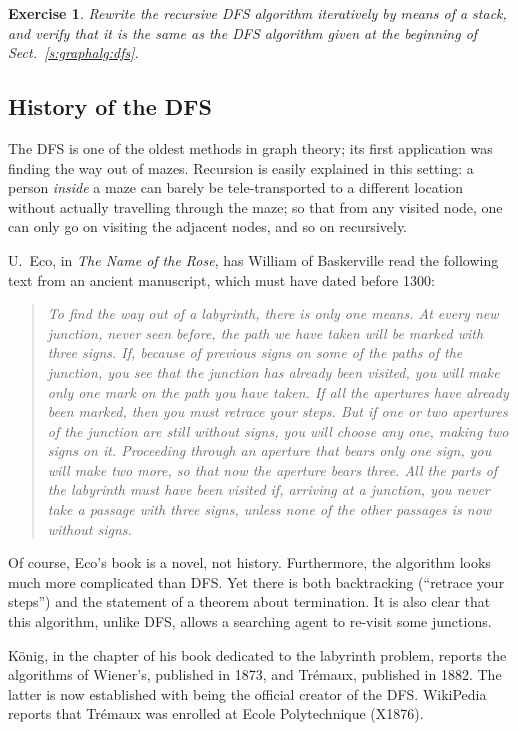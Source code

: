 \documentclass[a4paper]{book}
\theoremstyle{changebreak}                %
\newtheorem{ex}[result]{Exercise}
\begin{document}
\begin{ex}
Rewrite the recursive DFS algorithm iteratively by means of a stack,
and verify that it is the same as the DFS algorithm given at the
beginning of Sect.~\ref{s:graphalg:dfs}.
\end{ex}

\subsection{History of the DFS}
The DFS is one of the oldest methods in graph
theory; its first application was finding the way
out of mazes. Recursion is easily
explained in this setting: a person {\it inside} a maze can barely be
tele-transported to a different location without actually travelling
through the maze; so that from any visited node, one can only go on
visiting the adjacent nodes, and so on recursively.

U.~Eco, in {\it The Name of the Rose}, has William of
Baskerville read the following text from an ancient manuscript, which
must have dated before 1300:
\begin{quote}
  {\it To find the way out of a labyrinth, there is only one means.  At
  every new junction, never seen before, the path we have taken will
  be marked with three signs. If, because of previous signs on some of
  the paths of the junction, you see that the junction has already
  been visited, you will make only one mark on the path you have
  taken. If all the apertures have already been marked, then you must
  retrace your steps. But if one or two apertures of the junction are
  still without signs, you will choose any one, making two signs on
  it. Proceeding through an aperture that bears only one sign, you
  will make two more, so that now the aperture bears three. All the
  parts of the labyrinth must have been visited if, arriving at a
  junction, you never take a passage with three signs, unless none of
  the other passages is now without signs.}
\end{quote}
Of course, Eco's book is a novel, not history. Furthermore, the
algorithm looks much more complicated than DFS. Yet there is both
backtracking (``retrace your steps'') and the
statement of a theorem about termination. It is also clear that this
algorithm, unlike DFS, allows a searching agent to re-visit some
junctions.

K\"onig, in the chapter of his book \cite{koenig} dedicated to the
labyrinth problem, reports the algorithms of Wiener's, published in
1873, and Tr\'emaux, published in 1882. The latter is now established
\cite{graphhistory} with being the official creator of the
DFS. WikiPedia reports that Tr\'emaux was enrolled at Ecole
Polytechnique (X1876).
\end{document}
